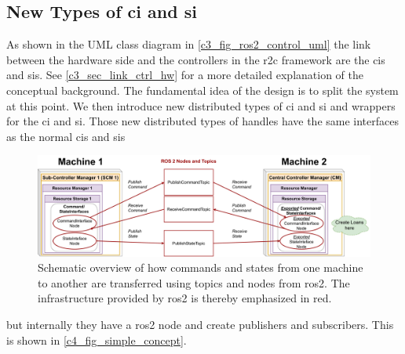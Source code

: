 \subsection{New Types of \gls{ci} and \gls{si}}\label{c4_sec_adaption_of_handles}
As shown in the UML class diagram in \autoref{c3_fig_ros2_control_uml} the link between the hardware side and the controllers in the \gls{r2c} framework are the \glspl{ci} and \glspl{si}. See \autoref{c3_sec_link_ctrl_hw} for a more detailed explanation of the conceptual background. \newline
The fundamental idea of the design is to split the system at this point. We then introduce new distributed types of \gls{ci} and \gls{si} and wrappers for the \gls{ci} and \gls{si}. Those new distributed types of handles have the same interfaces as the normal \glspl{ci} and \glspl{si} 
\begin{figure}[htbp]
	\centering
    \includegraphics[width=1\textwidth]{Figures/C4/simple_concept.drawio.pdf}
	\caption{Schematic overview of how commands and states from one machine to another are transferred using topics and nodes from \gls{ros2}. The infrastructure provided by \gls{ros2} is thereby emphasized in red.}
	\label{c4_fig_simple_concept}
\end{figure}
but internally they have a \gls{ros2} node and create publishers and subscribers. This is shown in \autoref{c4_fig_simple_concept}. \newline
